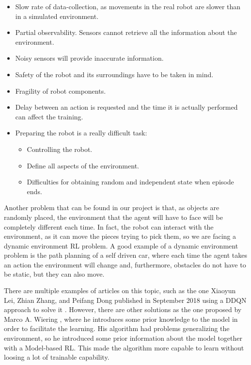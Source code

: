		\begin{itemize}
			\item[\textendash]Slow rate of data-collection, as movements in the real robot are slower than in a simulated environment. 
			\item[\textendash]Partial observability. Sensors cannot retrieve all the information about the environment.
			\item[\textendash]Noisy sensors will provide inaccurate information.
			\item[\textendash]Safety of the robot and its surroundings have to be taken in mind.			
			\item[\textendash]Fragility of robot components.
			\item[\textendash]Delay between an action is requested and the time it is actually performed can affect the training.
			\item[\textendash]Preparing the robot is a really difficult task:			
			\begin{itemize}
				\item[\textendash] Controlling the robot.
				\item[\textendash] Define all aspects of the environment.
				\item[\textendash] Difficulties for obtaining random and independent state when episode ends.
			\end{itemize}
		\end{itemize}
		
		Another problem that can be found in our project is that, as objects are randomly placed, the environment that the agent will have to face will be completely different each time. In fact, the robot can interact with the environment, as it can move the pieces trying to pick them, so we are facing a dynamic environment RL problem. A good example of a dynamic environment problem is the path planning of a self driven car, where each time the agent takes an action the environment will change and, furthermore, obstacles do not have to be static, but they can also move.
		
		There are multiple examples of articles on this topic, such as the one Xiaoyun Lei, Zhian Zhang, and Peifang Dong published in September 2018 using a DDQN approach to solve it \cite{lei_dynamic_2018}. However, there are other solutions as the one proposed by Marco A. Wiering \cite{wiering_reinforcement_2001}, where he introduces some prior knowledge to the model in order to facilitate the learning. His algorithm had problems generalizing the environment, so he introduced some prior information about the model together with a Model-based RL. This made the algorithm more capable to learn without loosing a lot of trainable capability.
		
		
